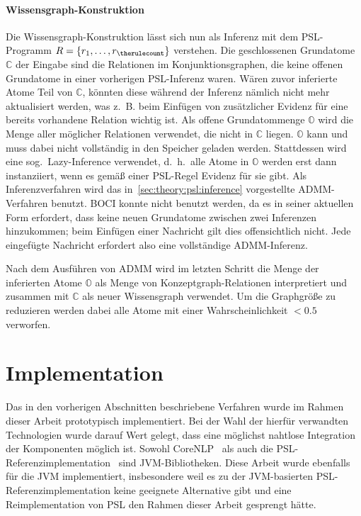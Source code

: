 \paragraph{Wissensgraph-Konstruktion}
Die Wissensgraph-Konstruktion lässt sich nun als Inferenz mit dem PSL-Programm $R = \{ \ruleno{1}, \dots, \rulecurrent \}$ verstehen.
Die geschlossenen Grund\-atome $\mathbb{C}$ der Eingabe sind die Relationen im Konjunktionsgraphen, die keine offenen Grundatome in einer vorherigen PSL-Inferenz waren.
Wären zuvor inferierte Atome Teil von $\mathbb{C}$, könnten diese während der Inferenz nämlich nicht mehr aktualisiert werden, was z.~B. beim Einfügen von zusätzlicher Evidenz für eine bereits vorhandene Relation wichtig ist.
Als offene Grundatommenge $\mathbb{O}$ wird die Menge aller möglicher Relationen verwendet, die nicht in $\mathbb{C}$ liegen.
$\mathbb{O}$ kann und muss dabei nicht vollständig in den Speicher geladen werden.
Stattdessen wird eine sog.\ Lazy-Inference verwendet, d.~h.\ alle Atome in $\mathbb{O}$ werden erst dann instanziiert, wenn es gemäß einer PSL-Regel Evidenz für sie gibt.
Als Inferenzverfahren wird das in~\ref{sec:theory:psl:inference} vorgestellte ADMM-Verfahren benutzt.
BOCI konnte nicht benutzt werden, da es in seiner aktuellen Form erfordert, dass keine neuen Grundatome zwischen zwei Inferenzen hinzukommen;
beim Einfügen einer Nachricht gilt dies offensichtlich nicht.
Jede eingefügte Nachricht erfordert also eine vollständige ADMM-Inferenz.

Nach dem Ausführen von ADMM wird im letzten Schritt die Menge der inferierten Atome $\mathbb{O}$ als Menge von Konzeptgraph-Relationen interpretiert und zusammen mit $\mathbb{C}$ als neuer Wissensgraph verwendet.
Um die Graphgröße zu reduzieren werden dabei alle Atome mit einer Wahrscheinlichkeit $< 0.5$ verworfen.

\section{Implementation}%
\label{sec:text2kg:implementation}

Das in den vorherigen Abschnitten beschriebene Verfahren wurde im Rahmen dieser Arbeit prototypisch implementiert.
Bei der Wahl der hierfür verwandten Technologien wurde darauf Wert gelegt, dass eine möglichst nahtlose Integration der Komponenten möglich ist.
Sowohl CoreNLP~\cite{CoreNLP} als auch die PSL-Referenzimplementation~\cite{PSL} sind JVM-Bibliotheken.
Diese Arbeit wurde ebenfalls für die JVM implementiert, insbesondere weil es zu der JVM-basierten PSL-Referenzimplementation keine geeignete Alternative gibt und eine Reimplementation von PSL den Rahmen dieser Arbeit gesprengt hätte.

